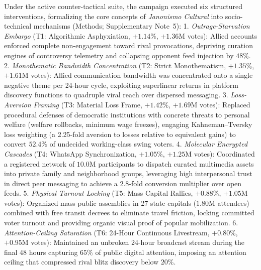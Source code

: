 \documentclass[11pt,a4paper]{article}
\begin{document}
Under the active counter-tactical suite, the campaign executed six structured interventions, formalizing the core concepts of \emph{Janonismo Cultural} into socio-technical mechanisms (Methods; Supplementary Note~5):
1. \emph{Outrage-Starvation Embargo} (T1: Algorithmic Asphyxiation, $+1.14\%$, $+1.36\mathrm{M}$ votes): Allied accounts enforced complete non-engagement toward rival provocations, depriving curation engines of controversy telemetry and collapsing opponent feed injection by $48\%$.
2. \emph{Monothematic Bandwidth Concentration} (T2: Strict Monothematism, $+1.35\%$, $+1.61\mathrm{M}$ votes): Allied communication bandwidth was concentrated onto a single negative theme per 24-hour cycle, exploiting superlinear returns in platform discovery functions to quadruple viral reach over dispersed messaging.
3. \emph{Loss-Aversion Framing} (T3: Material Loss Frame, $+1.42\%$, $+1.69\mathrm{M}$ votes): Replaced procedural defenses of democratic institutions with concrete threats to personal welfare (welfare rollbacks, minimum wage freezes), engaging Kahneman--Tversky loss weighting (a 2.25-fold aversion to losses relative to equivalent gains) to convert $52.4\%$ of undecided working-class swing voters.
4. \emph{Molecular Encrypted Cascades} (T4: WhatsApp Synchronization, $+1.05\%$, $+1.25\mathrm{M}$ votes): Coordinated a registered network of $10.0\mathrm{M}$ participants to dispatch curated multimedia assets into private family and neighborhood groups, leveraging high interpersonal trust in direct peer messaging to achieve a 2.8-fold conversion multiplier over open feeds.
5. \emph{Physical Turnout Locking} (T5: Mass Capital Rallies, $+0.88\%$, $+1.05\mathrm{M}$ votes): Organized mass public assemblies in 27 state capitals ($1.80\mathrm{M}$ attendees) combined with free transit decrees to eliminate travel friction, locking committed voter turnout and providing organic visual proof of popular mobilization.
6. \emph{Attention-Ceiling Saturation} (T6: 24-Hour Continuous Livestream, $+0.80\%$, $+0.95\mathrm{M}$ votes): Maintained an unbroken 24-hour broadcast stream during the final 48 hours capturing $65\%$ of public digital attention, imposing an attention ceiling that compressed rival blitz discovery below $20\%$.
\end{document}
